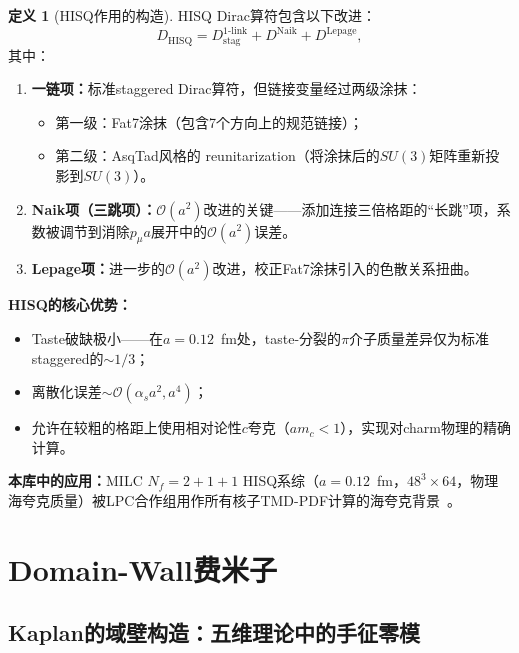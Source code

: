 \documentclass[12pt,a4paper]{ctexart}
\theoremstyle{definition}
\newtheorem{definition}{定义}[section]
\begin{document}
\begin{definition}[HISQ作用的构造]
HISQ Dirac算符包含以下改进：
\begin{equation}
D_{\text{HISQ}} = D_{\text{stag}}^{\text{1-link}} + D^{\text{Naik}} + D^{\text{Lepage}},
\label{eq:HISQ}
\end{equation}
其中：
\begin{enumerate}[nosep]
    \item \textbf{一链项：}标准staggered Dirac算符，但链接变量经过两级涂抹：
    \begin{itemize}
        \item 第一级：Fat7涂抹（包含7个方向上的规范链接）；
        \item 第二级：AsqTad风格的 reunitarization（将涂抹后的$SU(3)$矩阵重新投影到$SU(3)$）。
    \end{itemize}
    \item \textbf{Naik项（三跳项）：}$\mathcal{O}(a^2)$改进的关键——添加连接三倍格距的``长跳''项，系数被调节到消除$p_\mu a$展开中的$\mathcal{O}(a^2)$误差。
    \item \textbf{Lepage项：}进一步的$\mathcal{O}(a^2)$改进，校正Fat7涂抹引入的色散关系扭曲。
\end{enumerate}
\end{definition}

\textbf{HISQ的核心优势：}
\begin{itemize}
    \item Taste破缺极小——在$a=0.12$~fm处，taste-分裂的$\pi$介子质量差异仅为标准staggered的$\sim\!1/3$；
    \item 离散化误差$\sim\mathcal{O}(\alpha_s a^2, a^4)$；
    \item 允许在较粗的格距上使用相对论性$c$夸克（$am_c < 1$），实现对charm物理的精确计算。
\end{itemize}

\textbf{本库中的应用：}MILC $N_f=2+1+1$ HISQ系综（$a=0.12$~fm，$48^3\times64$，物理海夸克质量）被LPC合作组用作所有核子TMD-PDF计算的海夸克背景~\cite{He2024unpolTMD,Ma2025BoerMulders}。

\section{Domain-Wall费米子}

\subsection{Kaplan的域壁构造：五维理论中的手征零模}
\end{document}
